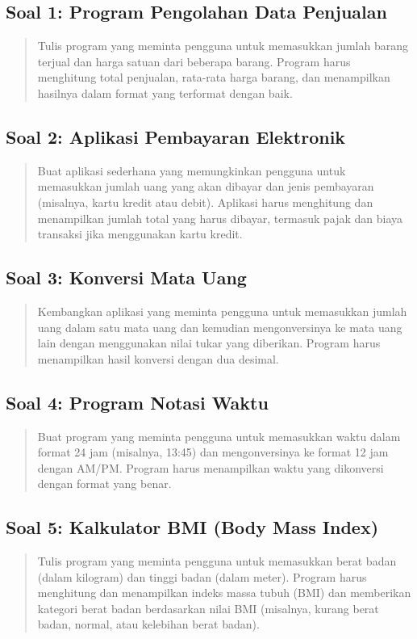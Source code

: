 \subsection{Soal 1: Program Pengolahan Data Penjualan}

\begin{quote}
	Tulis program yang meminta pengguna untuk memasukkan jumlah barang terjual dan harga satuan dari beberapa barang. Program harus menghitung total penjualan, rata-rata harga barang, dan menampilkan hasilnya dalam format yang terformat dengan baik.
\end{quote}

\subsection{Soal 2: Aplikasi Pembayaran Elektronik}

\begin{quote}
	Buat aplikasi sederhana yang memungkinkan pengguna untuk memasukkan jumlah uang yang akan dibayar dan jenis pembayaran (misalnya, kartu kredit atau debit). Aplikasi harus menghitung dan menampilkan jumlah total yang harus dibayar, termasuk pajak dan biaya transaksi jika menggunakan kartu kredit.
\end{quote}

\subsection{Soal 3: Konversi Mata Uang}

\begin{quote}
	Kembangkan aplikasi yang meminta pengguna untuk memasukkan jumlah uang dalam satu mata uang dan kemudian mengonversinya ke mata uang lain dengan menggunakan nilai tukar yang diberikan. Program harus menampilkan hasil konversi dengan dua desimal.
\end{quote}

\subsection{Soal 4: Program Notasi Waktu}

\begin{quote}
	Buat program yang meminta pengguna untuk memasukkan waktu dalam format 24 jam (misalnya, 13:45) dan mengonversinya ke format 12 jam dengan AM/PM. Program harus menampilkan waktu yang dikonversi dengan format yang benar.
\end{quote}

\subsection{Soal 5: Kalkulator BMI (Body Mass Index)}

\begin{quote}
	Tulis program yang meminta pengguna untuk memasukkan berat badan (dalam kilogram) dan tinggi badan (dalam meter). Program harus menghitung dan menampilkan indeks massa tubuh (BMI) dan memberikan kategori berat badan berdasarkan nilai BMI (misalnya, kurang berat badan, normal, atau kelebihan berat badan).
\end{quote}

